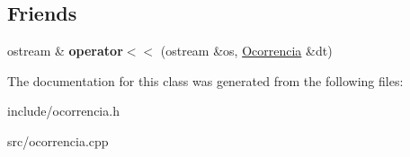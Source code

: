 \subsection*{Friends}
\begin{DoxyCompactItemize}
\item 
\mbox{\label{classOcorrencia_a1c6c7fc44d22943413573dc92dd05313}} 
ostream \& {\bfseries operator$<$$<$} (ostream \&os, \hyperlink{classOcorrencia}{Ocorrencia} \&dt)
\end{DoxyCompactItemize}


The documentation for this class was generated from the following files\+:\begin{DoxyCompactItemize}
\item 
include/ocorrencia.\+h\item 
src/ocorrencia.\+cpp\end{DoxyCompactItemize}
